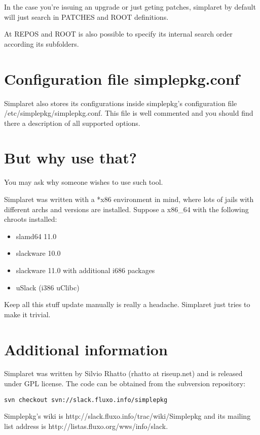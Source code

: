 \documentclass{article}
\begin{document}
In the case you're issuing an upgrade or just geting patches, simplaret by default will just search in PATCHES and ROOT definitions.

At REPOS and ROOT is also possible to specify its internal search order according its subfolders.

\section{Configuration file simplepkg.conf}

Simplaret also stores its configurations inside simplepkg's configuration file /etc/simplepkg/simplepkg.conf. This file is well commented and you should find there a description of all supported options.

\section{But why use that?}

You may ask why someone wishes to use such tool.

Simplaret was written with a *x86 environment in mind, where lots of jails with different archs and versions are installed. Suppose a x86\_64 with the following chroots installed:

\begin{itemize}
  \item slamd64 11.0
  \item slackware 10.0
  \item slackware 11.0 with additional i686 packages
  \item uSlack (i386 uClibc) 
\end{itemize}

Keep all this stuff update manually is really a headache. Simplaret just tries to make it trivial.

\section{Additional information}

Simplaret was written by Silvio Rhatto (rhatto at riseup.net) and is released under GPL license. The code can be obtained from the subversion repository:

\begin{verbatim}
svn checkout svn://slack.fluxo.info/simplepkg
\end{verbatim}

Simplepkg's wiki is http://slack.fluxo.info/trac/wiki/Simplepkg and its mailing list address is http://listas.fluxo.org/wws/info/slack.
\end{document}
